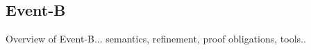 
\subsection{Event-B}
\label{sec:eventb}

Overview of Event-B... semantics, refinement, proof obligations, tools..

